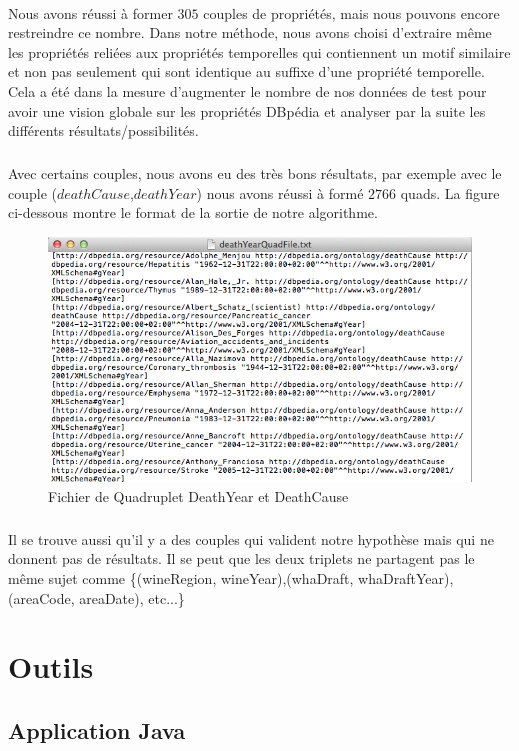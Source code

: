 \documentclass[12pt,a4	]{report}
\begin{document}
\paragraph{}
Nous avons réussi à former $305$ couples de propriétés, mais nous pouvons encore restreindre ce nombre. Dans notre méthode, nous avons choisi d'extraire même les propriétés reliées aux propriétés temporelles qui contiennent un motif similaire et non pas seulement qui sont identique au suffixe d'une propriété temporelle. Cela a été dans la mesure d'augmenter le nombre de nos données de test pour avoir une vision globale sur les propriétés DBpédia et analyser par la suite les différents résultats/possibilités. 
\subparagraph{}
Avec certains couples, nous avons eu des très bons résultats, par exemple avec le couple ($deathCause$,$deathYear$) nous avons réussi à formé $2766$ quads. La figure ci-dessous montre le format de la sortie de notre algorithme.
 \begin{figure}[H]
        \centering
                \includegraphics[width=13cm]{DeathYearCause.png}
               \caption{Fichier de Quadruplet DeathYear et DeathCause}
\end{figure}
\subparagraph{}
Il se trouve aussi qu'il y a des couples qui valident notre hypothèse mais qui ne donnent pas de résultats. Il se peut que les deux triplets ne partagent pas le même sujet comme \{(wineRegion, wineYear),(whaDraft, whaDraftYear),(areaCode, areaDate), etc...\}
\newpage
\section{Outils}
\subsection{Application Java}
\end{document}

